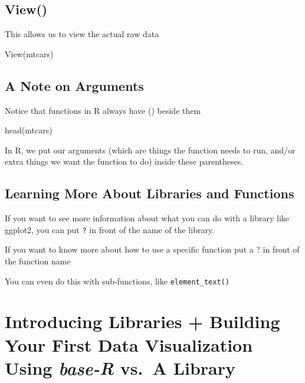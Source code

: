 \documentclass[
]{book}
\newenvironment{Shaded}{\begin{snugshade}}{\end{snugshade}}
\newcommand{\FunctionTok}[1]{\textcolor[rgb]{0.00,0.00,0.00}{#1}}
\newcommand{\NormalTok}[1]{#1}
\begin{document}
\hypertarget{view}{%
\section{View()}\label{view}}

This allows us to view the actual raw data

\begin{Shaded}
\begin{Highlighting}[]
\FunctionTok{View}\NormalTok{(mtcars)}
\end{Highlighting}
\end{Shaded}

\hypertarget{a-note-on-arguments}{%
\section{A Note on Arguments}\label{a-note-on-arguments}}

Notice that functions in R always have () beside them

head(mtcars)

In R, we put our arguments (which are things the function needs to run, and/or extra things we want the function to do) inside these parentheses.

\hypertarget{learning-more-about-libraries-and-functions}{%
\section{Learning More About Libraries and Functions}\label{learning-more-about-libraries-and-functions}}

If you want to see more information about what you can do with a library like ggplot2, you can put \texttt{?} in front of the name of the library.

If you want to know more about how to use a specific function put a ? in front of the function name

You can even do this with sub-functions, like \texttt{element\_text()}

\hypertarget{introducing-libraries-building-your-first-data-visualization-using-base-r-vs.-a-library}{%
\chapter{\texorpdfstring{Introducing Libraries + Building Your First Data Visualization Using \emph{base-R} vs.~A Library}{Introducing Libraries + Building Your First Data Visualization Using base-R vs.~A Library}}\label{introducing-libraries-building-your-first-data-visualization-using-base-r-vs.-a-library}}
\end{document}
